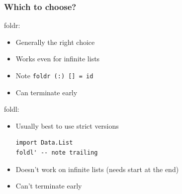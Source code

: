 \documentclass{article}[18pt]
\begin{document}
\subsubsection{Which to choose?}
foldr:
\begin{itemize}
	\item Generally the right choice
	\item Works even for infinite lists
	\item Note \texttt{foldr (:) [] = id}
	\item Can terminate early
\end{itemize}
foldl:
\begin{itemize}
	\item Usually best to use strict versions
\begin{verbatim}
import Data.List
foldl' -- note trailing
\end{verbatim}
	\item Doesn't work on infinite lists (needs start at the end)
	\item Can't terminate early
\end{itemize}
\end{document}

